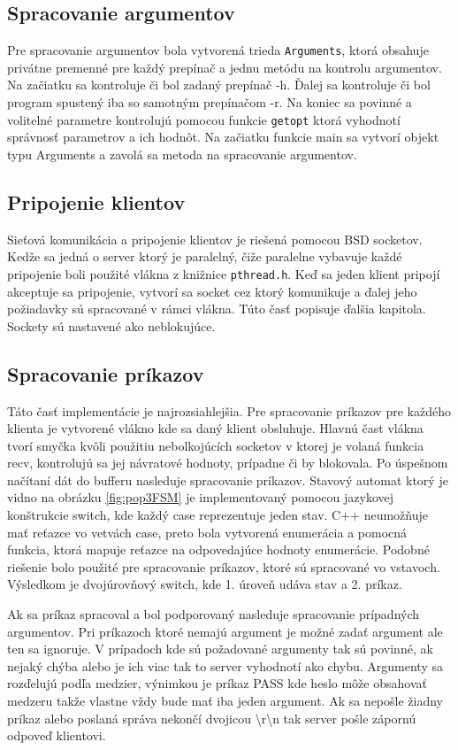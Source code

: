 \documentclass[11pt,a4paper]{article}
\begin{document}
\subsection{Spracovanie argumentov}
Pre spracovanie argumentov bola vytvorená trieda \texttt{Arguments}, ktorá obsahuje privátne premenné pre každý prepínač a jednu metódu na kontrolu argumentov. Na začiatku sa kontroluje či bol zadaný prepínač -h. Ďalej sa kontroluje či bol program spustený iba so samotným prepínačom -r. Na koniec sa povinné a volitelné parametre kontrolujú pomocou funkcie \texttt{getopt} ktorá vyhodnotí správnosť parametrov a ich hodnôt. Na začiatku funkcie main sa vytvorí objekt typu Arguments a zavolá sa metoda na spracovanie argumentov.

\subsection{Pripojenie klientov}
Sieťová komunikácia a pripojenie klientov je riešená pomocou BSD socketov. Kedže sa jedná o server ktorý je paralelný, čiže paralelne vybavuje každé pripojenie boli použité vlákna z knižnice \texttt{pthread.h}. Keď sa jeden klient pripojí akceptuje sa pripojenie, vytvorí sa socket cez ktorý komunikuje a ďalej jeho požiadavky sú spracované v rámci vlákna. Túto časť popisuje ďalšia kapitola. Sockety sú nastavené ako neblokujúce.

\subsection{Spracovanie príkazov}

Táto časť implementácie je najrozsiahlejšia. Pre spracovanie príkazov pre každého klienta je vytvorené vlákno kde sa daný klient obsluhuje. Hlavnú čast vlákna tvorí smyčka kvôli použitiu nebolkojúcích socketov v ktorej je volaná funkcia recv, kontrolujú sa jej návratové hodnoty, prípadne či by blokovala. Po úspešnom načítaní dát do bufferu nasleduje spracovanie príkazov. Stavový automat ktorý je vidno na obrázku \ref{fig:pop3FSM} je implementovaný pomocou jazykovej konštrukcie switch, kde každý case reprezentuje jeden stav. C++ neumožňuje mať reťazce vo vetvách case, preto bola vytvorená enumerácia a pomocná funkcia, ktorá mapuje reťazce na odpovedajúce hodnoty enumerácie. Podobné riešenie bolo použité pre spracovanie príkazov, ktoré sú spracované vo vstavoch. Výsledkom je dvojúrovňový switch, kde 1. úroveň udáva stav a 2. príkaz.

Ak sa príkaz spracoval a bol podporovaný nasleduje spracovanie prípadných argumentov. Pri príkazoch ktoré nemajú argument je možné zadať argument ale ten sa ignoruje. V prípadoch kde sú požadované argumenty tak sú povinné, ak nejaký chýba alebo je ich viac tak to server vyhodnotí ako chybu. Argumenty sa rozďelujú podľa medzier, výnimkou je príkaz PASS kde heslo môže obsahovať medzeru takže vlastne vždy bude mať iba jeden argument. Ak sa nepošle žiadny príkaz alebo poslaná správa nekončí dvojicou \textbackslash r\textbackslash n tak server pošle zápornú odpoveď klientovi.
\end{document}
